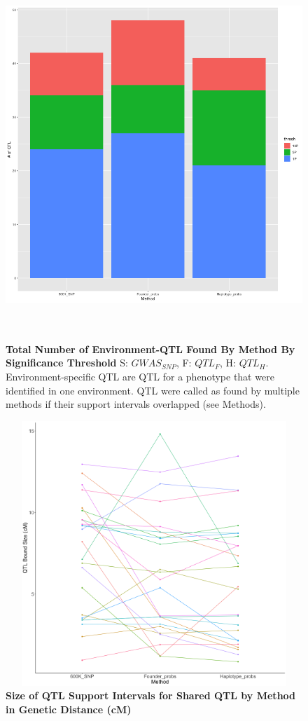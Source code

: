 \documentclass[article,9pt,twocolumn,twoside]{rilabRxiv}
\begin{document}
\begin{figure}[ht]
\centering
\includegraphics[width=\textwidth,height=14cm]{figures/threshold_by_method_counts.png}
\caption{\textbf{Total Number of Environment-QTL Found By Method By Significance Threshold} S: $GWAS_{SNP}$, F: $QTL_F$, H: $QTL_H$. Environment-specific QTL are QTL for a phenotype that were identified in one environment. QTL were called as found by multiple methods if their support intervals overlapped (see Methods).}
\label{fig:supfigure3}
\end{figure}

\begin{figure}[ht]
\centering
\includegraphics[width=16cm,height=10cm]{figures/support_interval_cM.png}
\caption{\textbf{Size of QTL Support Intervals for Shared QTL by Method in Genetic Distance (cM)}}
\label{fig:supfigure15}
\end{figure}
\end{document}
